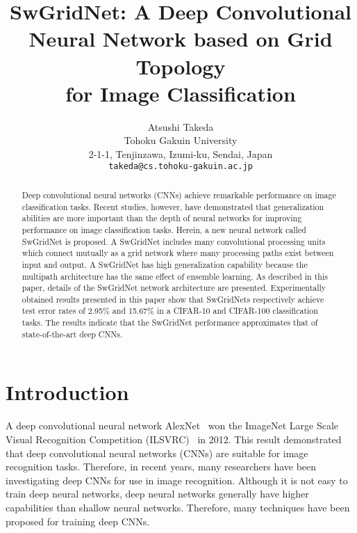 \documentclass[10pt,twocolumn,letterpaper]{article}
\begin{document}
\title{SwGridNet: A Deep Convolutional Neural Network based on Grid Topology\\ for Image Classification}

\author{Atsushi Takeda\\
Tohoku Gakuin University\\
2-1-1, Tenjinzawa, Izumi-ku, Sendai, Japan\\
{\tt\small takeda@cs.tohoku-gakuin.ac.jp}
}

\maketitle

\begin{abstract}
Deep convolutional neural networks (CNNs) achieve remarkable performance on image classification tasks.
Recent studies, however, have demonstrated that generalization abilities are more important than the depth of neural networks for improving performance on image classification tasks.
Herein, a new neural network called SwGridNet is proposed.
A SwGridNet includes many convolutional processing units which connect mutually as a grid network where many processing paths exist between input and output.
A SwGridNet has high generalization capability because the multipath architecture has the same effect of ensemble learning.
As described in this paper, details of the SwGridNet network architecture are presented.
Experimentally obtained results presented in this paper show that SwGridNets respectively achieve test error rates of 2.95\% and 15.67\% in a CIFAR-10 and CIFAR-100 classification tasks.
The results indicate that the SwGridNet performance approximates that of state-of-the-art deep CNNs.
\end{abstract}

\section{Introduction}
\label{sec:introduction}

A deep convolutional neural network AlexNet~\cite{AlexNet} won the ImageNet Large Scale Visual Recognition Competition (ILSVRC)~\cite{ILSVRC} in 2012.
This result demonstrated that deep convolutional neural networks (CNNs) are suitable for image recognition tasks.
Therefore, in recent years, many researchers have been investigating deep CNNs for use in image recognition.
Although it is not easy to train deep neural networks,
deep neural networks generally have higher capabilities than shallow neural networks.
Therefore, many techniques have been proposed for training deep CNNs.
\end{document}
